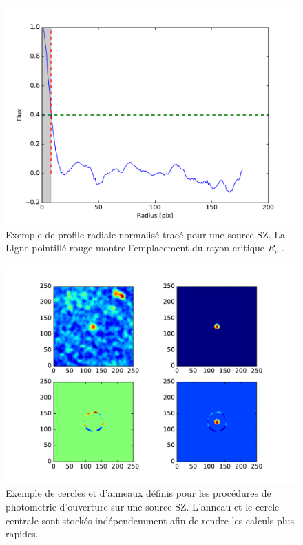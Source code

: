 \documentclass[a4paper,11pt]{article}
\begin{document}
\begin{figure}[h!]
  \centering
  \label{profile radial}
  \includegraphics[scale = 0.5]{profile_radiale_ama.pdf}
  \caption{Exemple de profile radiale normalisé tracé pour une source SZ. La Ligne pointillé rouge montre 
  l'emplacement du rayon critique $R_c$ .}
\end{figure}


\begin{figure}[h!]
  \centering
  \label{photometrie d'ouverture}
  \includegraphics[scale = 0.8]{exemple_photometrie_d'ouverture.pdf}
  \caption{Exemple de cercles et d'anneaux définis pour les procédures de photometrie d'ouverture sur une source SZ. 
  L'anneau et le cercle centrale sont stockés indépendemment afin de rendre les calculs plus rapides.}
\end{figure}
\end{document}
